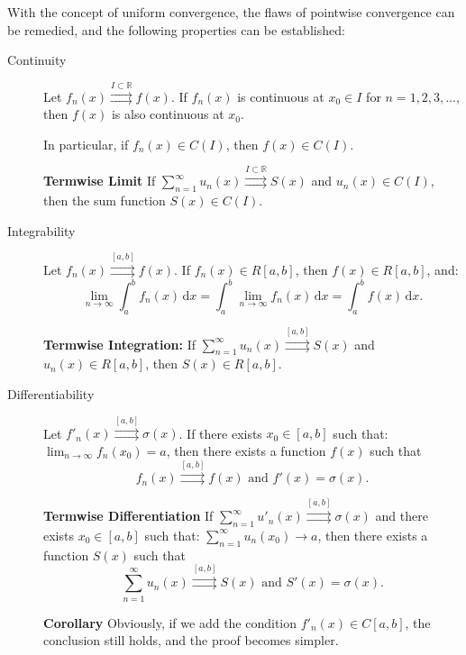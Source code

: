 \documentclass[11pt]{../../TexTemplate/elegantbook}
\begin{document}
With the concept of uniform convergence, the flaws of pointwise convergence can be remedied,
and the following properties can be established:
\begin{property}
    \begin{description}
        \item  [Continuity]
            Let \( f_n(x) \mathop{\rightrightarrows}\limits^{I \subset \mathbb{R}} f(x) \). 
            If \( f_n(x) \) is continuous at \( x_0 \in I \) for \( n = 1, 2, 3, \dots \), 
            then \( f(x) \) is also continuous at \( x_0 \). 

            In particular, if \( f_n(x) \in C(I) \), then \( f(x) \in C(I) \).

            \textbf{Termwise Limit} If \( \sum_{n=1}^\infty u_n(x) \mathop{\rightrightarrows}\limits^{I \subset \mathbb{R}} S(x) \) 
            and \( u_n(x) \in C(I) \), then the sum function \( S(x) \in C(I) \).
        \item  [Integrability]
            Let \( f_n(x) \mathop{\rightrightarrows}\limits^{[a, b]} f(x) \). 
            If \( f_n(x) \in R[a, b] \), then \( f(x) \in R[a, b] \), and:
            \[
            \lim_{n \to \infty} \int_a^b f_n(x) \, \mathrm{d}x = \int_a^b \lim_{n \to \infty} f_n(x) \, \mathrm{d}x = \int_a^b f(x) \, \mathrm{d}x.
            \]

            \textbf{Termwise Integration:} If \( \sum_{n=1}^\infty u_n(x) \mathop{\rightrightarrows}\limits^{[a, b]} S(x) \) 
            and \( u_n(x) \in R[a, b] \), then \( S(x) \in R[a, b] \).

        \item [Differentiability]
            Let \( f'_n(x) \mathop{\rightrightarrows}\limits^{[a, b]} \sigma(x) \). 
            If there exists \( x_0 \in [a, b] \) such that:\(\lim_{n \to \infty} f_n(x_0) = a\),
            then there exists a function \( f(x) \) such that 
            \[ 
            f_n(x) \mathop{\rightrightarrows}\limits^{[a, b]} f(x) \text{ and } f'(x) = \sigma(x).
            \]
            
            \textbf{Termwise Differentiation} If 
            \( \sum_{n=1}^\infty u'_n(x) \mathop{\rightrightarrows}\limits^{[a, b]} \sigma(x) \) 
            and there exists \( x_0 \in [a, b] \) such that: \(\sum_{n=1}^\infty u_n(x_0) \to a\),
            then there exists a function \( S(x) \) such that 
            \[ 
            \sum_{n=1}^\infty u_n(x) \mathop{\rightrightarrows}\limits^{[a, b]} S(x) \text{ and } S'(x) = \sigma(x).
            \]

            \textbf{Corollary} Obviously, if we add the condition \( f'_n(x) \in C[a, b] \), the conclusion still holds, 
            and the proof becomes simpler.
    \end{description}
\end{property}
\end{document}
